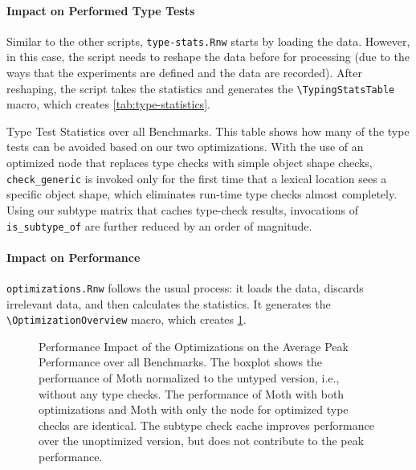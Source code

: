 \documentclass[a4paper,USenglish]{darts-v2019}
\newcommand{\ie}{i.e.\xspace}
\newcommand{\code}[1]{\texttt{#1}}
\begin{document}
\begin{itemize}
\paragraph*{Impact on Performed Type Tests}

Similar to the other scripts,
\code{type-stats.Rnw} starts by loading the data.
However, in this case,
the script needs to reshape the data
before for processing
(due to the ways that the experiments are defined and the data are recorded).
After reshaping, the script takes the statistics
and generates the \code{\textbackslash{}TypingStatsTable} macro,
which creates \cref{tab:type-statistics}.

\begin{table}[htb]
  \caption{Type Test Statistics over all Benchmarks.
  This table shows how many of the type tests can be avoided based on our two optimizations.
  With the use of an optimized node that replaces type checks with simple object shape checks,
  \code{check\_generic} is invoked only for the first time that a lexical location
  sees a specific object shape, which eliminates run-time type checks almost completely.
  Using our subtype matrix that caches type-check results,
  invocations of \code{is\_subtype\_of} are further reduced by an order of magnitude.}
  \label{tab:type-statistics}

  \begin{center}
    \TypingStatsTable{}
  \end{center}
\end{table}

\paragraph*{Impact on Performance}

\code{optimizations.Rnw} follows the usual process:
it loads the data,
discards irrelevant data,
and then calculates the
statistics.
It generates the \code{\textbackslash{}OptimizationOverview} macro,
which creates \cref{fig:perf-impact-optimization}.

\begin{figure}[htb]
  \centering
	\OptimizationOverview{}
  \caption{Performance Impact of the Optimizations on the Average Peak Performance over all Benchmarks.
  The boxplot shows the performance of Moth normalized to the untyped version, \ie,
  without any type checks.
  The performance of Moth with both optimizations and Moth
  with only the node for optimized type checks are identical.
  The subtype check cache improves performance over the unoptimized version,
  but does not contribute to the peak performance.
  }
	\label{fig:perf-impact-optimization}
\end{figure}



\end{itemize}
\end{document}
